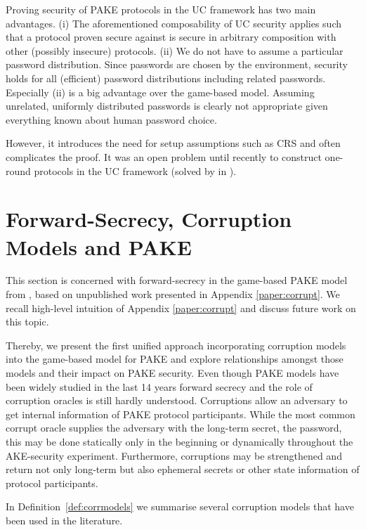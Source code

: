 \noindent
Proving security of \ac{PAKE} protocols in the \ac{UC} framework has two main advantages.
(i) The aforementioned composability of \ac{UC} security applies such that a protocol proven secure against \cFPAKE is secure in arbitrary composition with other (possibly insecure) protocols.
(ii) We do not have to assume a particular password distribution.
Since passwords are chosen by the environment, security holds for all (efficient) password distributions including related passwords.
Especially (ii) is a big advantage over the game-based model.
Assuming unrelated, uniformly distributed passwords is clearly not appropriate given everything known about human password choice.

However, it introduces the need for setup assumptions such as \ac{CRS} and often complicates the proof.
It was an open problem until recently to construct one-round protocols in the \ac{UC} framework (solved by \citeauthor{Benhamouda2013} \cite{Benhamouda2013} in \citeyear{Benhamouda2013}).

\section{Forward-Secrecy, Corruption Models and PAKE} \label{sec:corrupt}
This section is concerned with forward-secrecy in the game-based \ac{PAKE} model from \cite{Bellare2000,Abdalla2005}, based on unpublished work presented in Appendix \ref{paper:corrupt}.
We recall high-level intuition of Appendix \ref{paper:corrupt} and discuss future work on this topic.

Thereby, we present the first unified approach incorporating corruption models into the game-based model for \ac{PAKE} and explore relationships amongst those models and their impact on \ac{PAKE} security.
Even though \ac{PAKE} models have been widely studied in the last 14 years forward secrecy and the role of corruption oracles is still hardly understood.
Corruptions allow an adversary to get internal information of \ac{PAKE} protocol participants.
While the most common corrupt oracle supplies the adversary with the long-term secret, the password, this may be done statically only in the beginning or dynamically throughout the \ac{AKE}-security experiment.
Furthermore, corruptions may be strengthened and return not only long-term but also ephemeral secrets or other state information of protocol participants.

In Definition~\ref{def:corrmodels} we summarise several corruption models that have been used in the literature.

